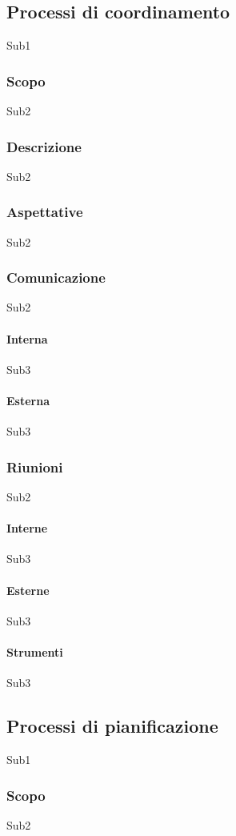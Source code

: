 \documentclass[../norme-di-progetto.tex]{subfiles}
\begin{document}
\subsection{Processi di coordinamento}
Sub1
    \subsubsection{Scopo}
    Sub2
    \subsubsection{Descrizione}
    Sub2
    \subsubsection{Aspettative}
    Sub2
    \subsubsection{Comunicazione}
    Sub2
        \paragraph{Interna}
        Sub3
        \paragraph{Esterna}
        Sub3
    \subsubsection{Riunioni}
    Sub2
        \paragraph{Interne}
        Sub3
        \paragraph{Esterne}
        Sub3
        \paragraph{Strumenti}
        Sub3

\subsection{Processi di pianificazione}
Sub1
    \subsubsection{Scopo}
    Sub2
\end{document}
